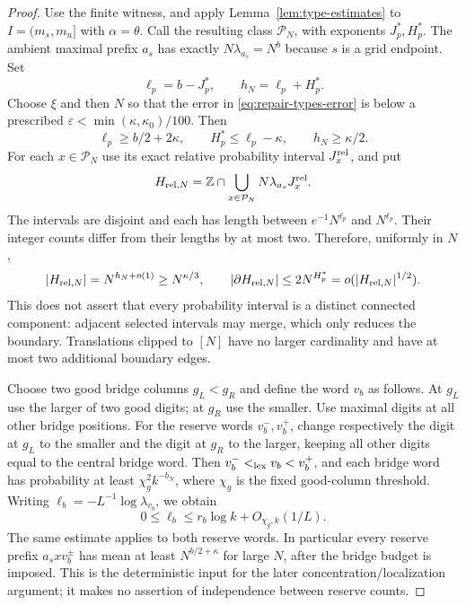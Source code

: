 \documentclass[11pt]{article}
\numberwithin{equation}{section}
\newcommand{\1}{\mathbf 1}
\begin{document}
\begin{proof}

Use the finite witness, and apply Lemma~\ref{lem:type-estimates} to
$I=(m_s,m_u]$ with $\alpha=\theta$.
Call the resulting class $\mathcal P_N$, with exponents $J_p^*,H_p^*$.
The ambient maximal prefix $a_s$ has exactly
$N\lambda_{a_s}=N^b$ because $s$ is a grid endpoint.
Set
\[
 \ell_p=b-J_p^*,\qquad h_N=\ell_p+H_p^*.
\]
Choose $\xi$ and then $N$ so that the error in
\eqref{eq:repair-types-error} is below a prescribed
$\varepsilon<\min(\kappa,\kappa_0)/100$.
Then
\begin{equation}\label{eq:repair-finite-geometric-buffers}
 \ell_p\ge b/2+2\kappa,\qquad
 H_p^*\le\ell_p-\kappa,\qquad h_N\ge\kappa/2.
\end{equation}
For each $x\in\mathcal P_N$ use its exact relative probability interval
$J_x^{\rm rel}$, and put
\[
 H_{{\rm rel},N}=\mathbb Z\cap\bigcup_{x\in\mathcal P_N}
                         N\lambda_{a_s}J_x^{\rm rel}.
\]
The intervals are disjoint and each has length between
$e^{-1}N^{\ell_p}$ and $N^{\ell_p}$.  Their integer counts differ from their
lengths by at most two.  Therefore, uniformly in $N$,
\[
 |H_{{\rm rel},N}|=N^{h_N+o(1)}\ge N^{\kappa/3},\qquad
 |\partial H_{{\rm rel},N}|\le2N^{H_p^*}
                         =o(|H_{{\rm rel},N}|^{1/2}).
\]
This does not assert that every probability interval is a distinct connected
component: adjacent selected intervals may merge, which only reduces the
boundary.  Translations clipped to $[N]$ have no larger cardinality and
have at most two additional boundary edges.

Choose two good bridge columns $g_L<g_R$ and define the word $v_b$ as follows.
At $g_L$ use the larger of two good digits; at $g_R$ use the smaller.
Use maximal digits at all other bridge positions.
For the reserve words $v_b^-,v_b^+$, change respectively the digit at
$g_L$ to the smaller and the digit at $g_R$ to the larger, keeping all
other digits equal to the central bridge word.
Then $v_b^-<_{\rm lex}v_b<v_b^+$, and each bridge word has probability at least
$\chi_g^2k^{-b_N}$, where $\chi_g$ is the fixed good-column threshold.
Writing $\ell_b=-L^{-1}\log\lambda_{v_b}$, we obtain
\[
 0\le\ell_b\le r_b\log k+O_{\chi_g,k}(1/L).
\]
The same estimate applies to both reserve words.  In particular every
reserve prefix $a_sxv_b^\pm$ has mean at least
$N^{b/2+\kappa}$ for large $N$, after the bridge budget is imposed.
This is the deterministic input for the later concentration/localization
argument; it makes no assertion of independence between reserve counts.


\end{proof}
\end{document}
